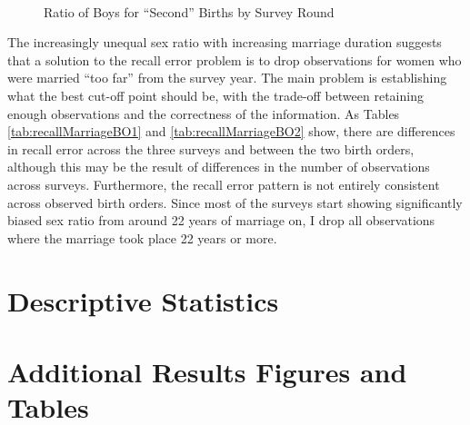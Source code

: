 \documentclass[12pt,letterpaper]{article}
\begin{document}
\begin{figure}
\centering
{}
 \\
\caption{Ratio of Boys for ``Second'' Births by Survey Round}
\label{fig:sex_ratio_recall_rounds_bo2}
\end{figure}


The increasingly unequal sex ratio with increasing marriage duration suggests that
a solution to the recall error problem is to drop observations for 
women who were married ``too far'' from the survey year.
The main problem is establishing what the best cut-off point should be, with the
trade-off between retaining enough observations and the correctness of the information.
As Tables \ref{tab:recallMarriageBO1} and \ref{tab:recallMarriageBO2} show, there are 
differences in recall error across the three surveys and between the two birth
orders, although this may be the result of differences in the number of observations 
across surveys.
Furthermore, the recall error pattern is not entirely consistent across observed birth 
orders.
Since most of the surveys start showing significantly biased sex ratio from around 22
years of marriage on, I drop all observations where the marriage took place 22 years
or more.


\clearpage
\newpage

\section{Descriptive Statistics}
\setcounter{figure}{0}
\setcounter{table}{0}




\clearpage
\newpage



\section{Additional Results Figures and  Tables}

\setcounter{figure}{0}
\setcounter{table}{0}

\captionsetup[figure]{skip = -16pt}
\end{document}
